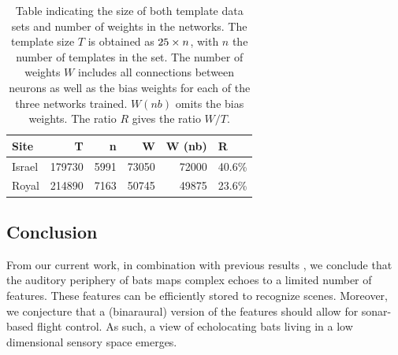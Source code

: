 \documentclass[preprint,5p]{elsarticle}
\begin{document}
\begin{table}
	\centering
	\begin{tabular}{lrrrrl}
		\toprule
		Site &       T &     n &      W &  W (nb) &      R \\
		\midrule
		Israel &  179730 &  5991 &  73050 &   72000 &  40.6\% \\
		Royal &  214890 &  7163 &  50745 &   49875 &  23.6\% \\
		\bottomrule
	\end{tabular}
	\label{tab:sizes}
	\caption{Table indicating the size of both template data sets and number of weights in the networks. The template size $T$ is obtained as $25 \times n$, with $n$ the number of templates in the set. The number of weights $W$ includes all connections between neurons as well as the bias weights for each of the three networks trained. $W (nb)$ omits the bias weights. The ratio $R$ gives the ratio $W/T$.}
\end{table}


\subsection{Conclusion}

From our current work, in combination with previous results \citep{Vanderelst2016,Vanderelst2015a,Mansour2019}, we conclude that the auditory periphery of bats maps complex echoes to a limited number of features. These features can be efficiently stored to recognize scenes. Moreover, we conjecture that a (binaraural) version of the features should allow for sonar-based flight control. As such, a view of echolocating bats living in a low dimensional sensory space emerges.





\end{document}
